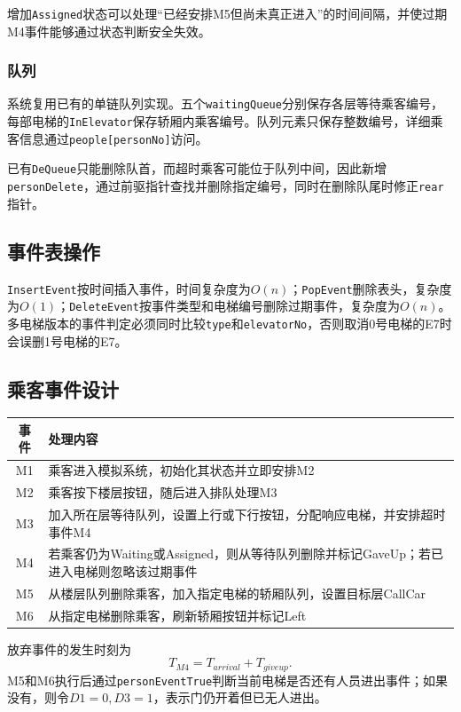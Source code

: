 \documentclass[UTF8,a4paper,12pt]{ctexart}
\begin{document}
增加\texttt{Assigned}状态可以处理“已经安排M5但尚未真正进入”的时间间隔，并使过期M4事件能够通过状态判断安全失效。

\subsubsection{队列}

系统复用已有的单链队列实现。五个\texttt{waitingQueue}分别保存各层等待乘客编号，每部电梯的\texttt{InElevator}保存轿厢内乘客编号。队列元素只保存整数编号，详细乘客信息通过\texttt{people[personNo]}访问。

已有\texttt{DeQueue}只能删除队首，而超时乘客可能位于队列中间，因此新增\texttt{personDelete}，通过前驱指针查找并删除指定编号，同时在删除队尾时修正\texttt{rear}指针。

\subsection{事件表操作}

\texttt{InsertEvent}按时间插入事件，时间复杂度为$O(n)$；\texttt{PopEvent}删除表头，复杂度为$O(1)$；\texttt{DeleteEvent}按事件类型和电梯编号删除过期事件，复杂度为$O(n)$。多电梯版本的事件判定必须同时比较\texttt{type}和\texttt{elevatorNo}，否则取消0号电梯的E7时会误删1号电梯的E7。

\subsection{乘客事件设计}

\begin{longtable}{cp{11cm}}
\toprule
事件 & 处理内容\\
\midrule
M1 & 乘客进入模拟系统，初始化其状态并立即安排M2\\
M2 & 乘客按下楼层按钮，随后进入排队处理M3\\
M3 & 加入所在层等待队列，设置上行或下行按钮，分配响应电梯，并安排超时事件M4\\
M4 & 若乘客仍为Waiting或Assigned，则从等待队列删除并标记GaveUp；若已进入电梯则忽略该过期事件\\
M5 & 从楼层队列删除乘客，加入指定电梯的轿厢队列，设置目标层CallCar\\
M6 & 从指定电梯删除乘客，刷新轿厢按钮并标记Left\\
\bottomrule
\end{longtable}

放弃事件的发生时刻为
\[
T_{M4}=T_{arrival}+T_{giveup}.
\]
M5和M6执行后通过\texttt{personEventTrue}判断当前电梯是否还有人员进出事件；如果没有，则令$D1=0,D3=1$，表示门仍开着但已无人进出。
\end{document}

